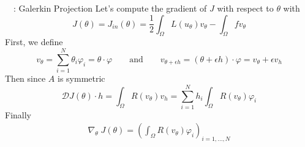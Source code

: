 \begin{frame}{\appendixname~\theappendixframenumber~: Galerkin Projection}
	Let's compute the gradient of $J$ with respect to $\theta$ with
	\begin{equation*}
		J(\theta)=J_{in}(\theta)=\frac{1}{2}\int_\Omega L(u_\theta)v_\theta - \int_\Omega fv_\theta
	\end{equation*}
	First, we define
	\begin{equation*}
		v_\theta=\sum_{i=1}^{N} \theta_i \varphi_i=\theta\cdot\varphi \qquad \text{and} \qquad v_{\theta+\epsilon h}=(\theta+\epsilon h)\cdot\varphi=v_\theta+\epsilon v_h
	\end{equation*}
	Then since $A$ is symmetric
	\begin{equation*}
		\mathcal{D}J(\theta)\cdot h =\int_\Omega R(v_\theta)v_h =\sum_{i=1}^N h_i\int_\Omega R(v_\theta)\varphi_i
	\end{equation*}
	Finally
	\begin{align*}
		\nabla_\theta \; J(\theta) = \left(\int_\Omega R(v_\theta)\varphi_i\right)_{i=1,\dots,N}
	\end{align*}
\end{frame}
\addtocounter{appendixframenumber}{1}

